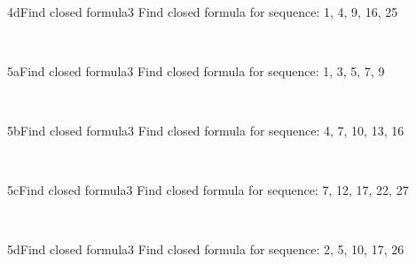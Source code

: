 \documentclass[a4paper,12pt]{book}
\begin{document}
    ~\\
    \begin{answersheetquestion}{4d}{Find closed formula}{3}
        Find closed formula for sequence: 1, 4, 9, 16, 25
        \iftoggle{answerkey}{ \begin{answer} $a_{n} = n^{2}$ \end{answer} }{ { ~\\ \raisebox{0pt}[2cm][0pt]{  } } }
    \end{answersheetquestion}

    \hrulefill
    ~\\
    \begin{answersheetquestion}{5a}{Find closed formula}{3}
        Find closed formula for sequence: 1, 3, 5, 7, 9
        \iftoggle{answerkey}{ \begin{answer} $a_{n} = 2n-1$ \end{answer} }{ { ~\\ \raisebox{0pt}[2cm][0pt]{  } } }
    \end{answersheetquestion}
    
    ~\\
    \begin{answersheetquestion}{5b}{Find closed formula}{3}
        Find closed formula for sequence: 4, 7, 10, 13, 16
        \iftoggle{answerkey}{ \begin{answer} $a_{n} = 3n+1$ \end{answer} }{ { ~\\ \raisebox{0pt}[2cm][0pt]{  } } }
    \end{answersheetquestion}
    
    ~\\
    \begin{answersheetquestion}{5c}{Find closed formula}{3}
        Find closed formula for sequence: 7, 12, 17, 22, 27
        \iftoggle{answerkey}{ \begin{answer} $a_{n} = 5n+2$ \end{answer} }{ { ~\\ \raisebox{0pt}[2cm][0pt]{  } } }
    \end{answersheetquestion}
    
    ~\\
    \begin{answersheetquestion}{5d}{Find closed formula}{3}
        Find closed formula for sequence: 2, 5, 10, 17, 26
        \iftoggle{answerkey}{ \begin{answer} $a_{n} = n^{2} + 1$ \end{answer} }{ { ~\\ \raisebox{0pt}[2cm][0pt]{  } } }
    \end{answersheetquestion}
\end{document}
